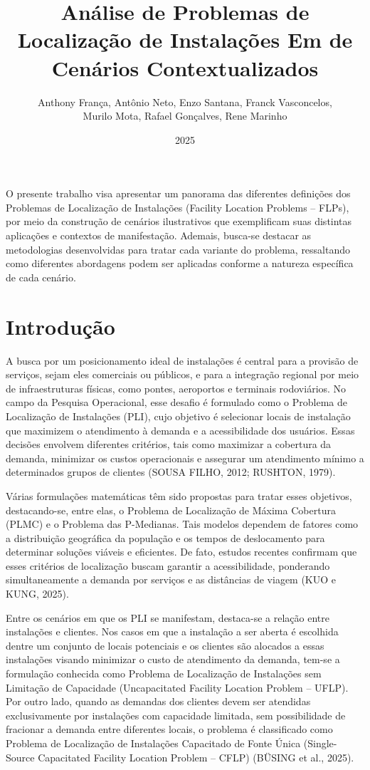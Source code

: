 \documentclass[12pt]{article}
\title{Análise de Problemas de Localização de Instalações Em de Cenários Contextualizados}
\author{Anthony França, Antônio Neto, Enzo Santana, Franck Vasconcelos,\\
Murilo Mota, Rafael Gonçalves, Rene Marinho}
\date{2025}
\begin{document}
 

\maketitle
     
\begin{resumo}
O presente trabalho visa apresentar um panorama das diferentes definições dos Problemas de Localização de Instalações (Facility Location Problems -- FLPs), por meio da construção de cenários ilustrativos que exemplificam suas distintas aplicações e contextos de manifestação. Ademais, busca-se destacar as metodologias desenvolvidas para tratar cada variante do problema, ressaltando como diferentes abordagens podem ser aplicadas conforme a natureza específica de cada cenário.
\end{resumo}

\section{Introdução}

A busca por um posicionamento ideal de instalações é central para a provisão de serviços, sejam eles comerciais ou públicos, e para a integração regional por meio de infraestruturas físicas, como pontes, aeroportos e terminais rodoviários. No campo da Pesquisa Operacional, esse desafio é formulado como o Problema de Localização de Instalações (PLI), cujo objetivo é selecionar locais de instalação que maximizem o atendimento à demanda e a acessibilidade dos usuários. Essas decisões envolvem diferentes critérios, tais como maximizar a cobertura da demanda, minimizar os custos operacionais e assegurar um atendimento mínimo a determinados grupos de clientes (SOUSA FILHO, 2012; RUSHTON, 1979).

Várias formulações matemáticas têm sido propostas para tratar esses objetivos, destacando-se, entre elas, o Problema de Localização de Máxima Cobertura (PLMC) e o Problema das P-Medianas. Tais modelos dependem de fatores como a distribuição geográfica da população e os tempos de deslocamento para determinar soluções viáveis e eficientes. De fato, estudos recentes confirmam que esses critérios de localização buscam garantir a acessibilidade, ponderando simultaneamente a demanda por serviços e as distâncias de viagem (KUO e KUNG, 2025).

Entre os cenários em que os PLI se manifestam, destaca-se a relação entre instalações e clientes. Nos casos em que a instalação a ser aberta é escolhida dentre um conjunto de locais potenciais e os clientes são alocados a essas instalações visando minimizar o custo de atendimento da demanda, tem-se a formulação conhecida como Problema de Localização de Instalações sem Limitação de Capacidade (Uncapacitated Facility Location Problem -- UFLP). Por outro lado, quando as demandas dos clientes devem ser atendidas exclusivamente por instalações com capacidade limitada, sem possibilidade de fracionar a demanda entre diferentes locais, o problema é classificado como Problema de Localização de Instalações Capacitado de Fonte Única (Single-Source Capacitated Facility Location Problem -- CFLP) (BÜSING et al., 2025).
\end{document}
